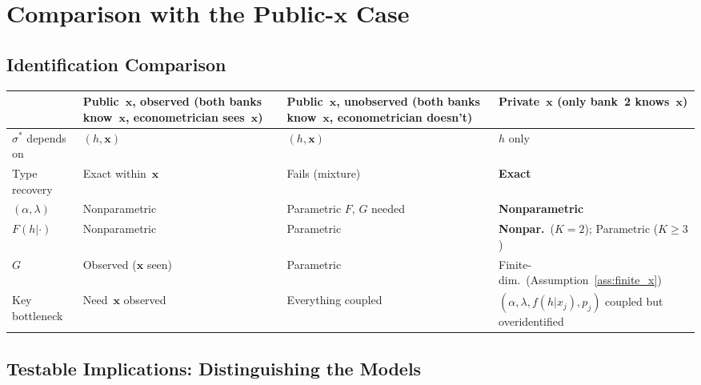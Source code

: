 \documentclass[12pt]{article}
\theoremstyle{plain}
\theoremstyle{plain}
\theoremstyle{definition}
\theoremstyle{remark}
\begin{document}
\newpage
\section{Comparison with the Public-$\mathbf{x}$ Case}\label{sec:comparison8}

\subsection{Identification Comparison}

\begin{center}
\renewcommand{\arraystretch}{1.5}
\begin{tabular}{p{2.8cm}p{4cm}p{4cm}p{3cm}}
\toprule
& \textbf{Public~$\mathbf{x}$, observed} \newline (both banks know~$\mathbf{x}$, \newline econometrician sees~$\mathbf{x}$) & \textbf{Public~$\mathbf{x}$, unobserved} \newline (both banks know~$\mathbf{x}$, \newline econometrician doesn't) & \textbf{Private~$\mathbf{x}$} \newline (only bank~2 knows~$\mathbf{x}$) \\
\midrule
$\sigma^*$ depends on & $(h, \mathbf{x})$ & $(h, \mathbf{x})$ & $h$ only \\[2pt]
Type recovery & Exact within~$\mathbf{x}$ & Fails (mixture) & \textbf{Exact} \\[2pt]
$(\alpha, \lambda)$ & Nonparametric & Parametric $F$, $G$ needed & \textbf{Nonparametric} \\[2pt]
$F(h|\cdot)$ & Nonparametric & Parametric & \textbf{Nonpar.}\ ($K\!=\!2$); Parametric ($K\!\geq\!3$) \\[2pt]
$G$ & Observed ($\mathbf{x}$ seen) & Parametric & Finite-dim.~(Assumption~\ref{ass:finite_x}) \\[2pt]
Key bottleneck & Need~$\mathbf{x}$ observed & Everything coupled & $(\alpha, \lambda, f(h|x_j), p_j)$ coupled but overidentified \\
\bottomrule
\end{tabular}
\end{center}

\subsection{Testable Implications: Distinguishing the Models}
\end{document}
